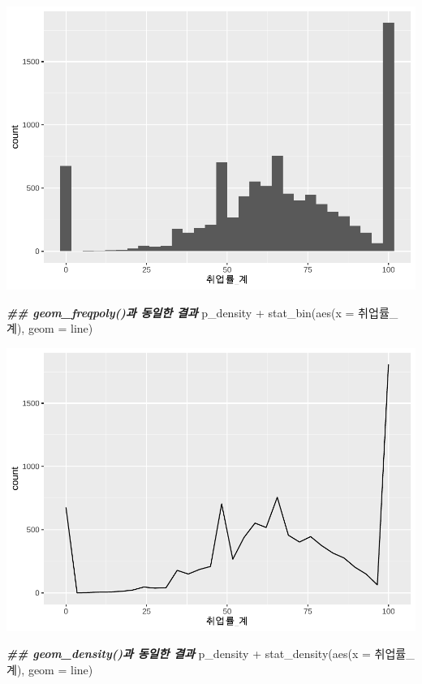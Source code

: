 \documentclass[
]{article}
\newenvironment{Shaded}{\begin{snugshade}}{\end{snugshade}}
\newcommand{\AttributeTok}[1]{\textcolor[rgb]{0.77,0.63,0.00}{#1}}
\newcommand{\DocumentationTok}[1]{\textcolor[rgb]{0.56,0.35,0.01}{\textbf{\textit{#1}}}}
\newcommand{\FunctionTok}[1]{\textcolor[rgb]{0.00,0.00,0.00}{#1}}
\newcommand{\NormalTok}[1]{#1}
\newcommand{\SpecialCharTok}[1]{\textcolor[rgb]{0.00,0.00,0.00}{#1}}
\newcommand{\StringTok}[1]{\textcolor[rgb]{0.31,0.60,0.02}{#1}}
\begin{document}
\includegraphics{chap3_files/figure-latex/unnamed-chunk-51-1.pdf}

\begin{Shaded}
\begin{Highlighting}[]
\DocumentationTok{\#\# geom\_freqpoly()과 동일한 결과}
\NormalTok{p\_density }\SpecialCharTok{+} 
  \FunctionTok{stat\_bin}\NormalTok{(}\FunctionTok{aes}\NormalTok{(}\AttributeTok{x =}\NormalTok{ 취업률\_계), }\AttributeTok{geom =} \StringTok{\textquotesingle{}line\textquotesingle{}}\NormalTok{)}
\end{Highlighting}
\end{Shaded}

\includegraphics{chap3_files/figure-latex/unnamed-chunk-51-2.pdf}

\begin{Shaded}
\begin{Highlighting}[]
\DocumentationTok{\#\# geom\_density()과 동일한 결과}
\NormalTok{p\_density }\SpecialCharTok{+} 
  \FunctionTok{stat\_density}\NormalTok{(}\FunctionTok{aes}\NormalTok{(}\AttributeTok{x =}\NormalTok{ 취업률\_계), }\AttributeTok{geom =} \StringTok{\textquotesingle{}line\textquotesingle{}}\NormalTok{)}
\end{Highlighting}
\end{Shaded}
\end{document}
